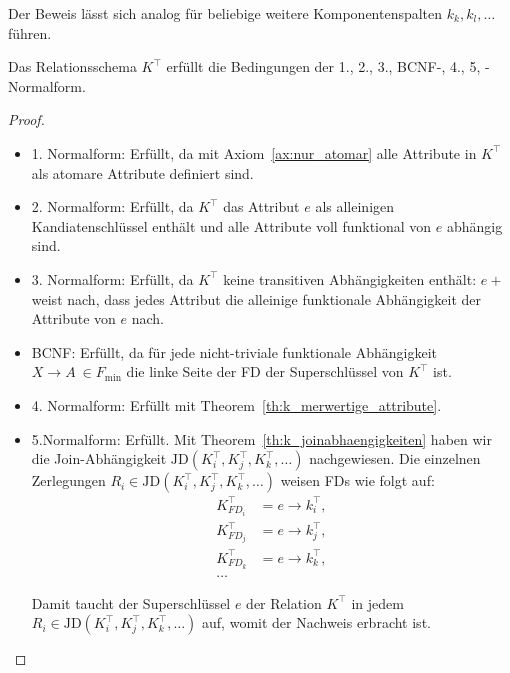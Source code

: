 \noindent
Der Beweis lässt sich analog für beliebige weitere Komponentenspalten $k_k, k_l, \ldots$ führen.

\bigskip
\begin{theorem}\label{f_min_norm}
    Das Relationsschema $K^\top$ erfüllt die Bedingungen der 1., 2., 3., BCNF-, 4., 5, -Normalform.
\end{theorem}

\begin{proof}
    \medskip
    {\ }
    \begin{itemize}
        \item 1. Normalform: Erfüllt, da mit Axiom~\ref{ax:nur_atomar} alle Attribute in $K^\top$ als atomare Attribute definiert sind.
        \item 2. Normalform: Erfüllt, da $K^\top$ das Attribut $e$ als alleinigen Kandiatenschlüssel enthält und alle Attribute voll funktional von $e$ abhängig sind.
        \item 3. Normalform: Erfüllt, da $K^\top$ keine transitiven Abhängigkeiten enthält: $e+$ weist nach, dass jedes Attribut  die alleinige funktionale Abhängigkeit der Attribute von $e$ nach.
        \item BCNF: Erfüllt, da für jede nicht-triviale funktionale Abhängigkeit $X \rightarrow A\ \in F_\text{min}$ die linke Seite der FD  der Superschlüssel von $K^\top$ ist.
        \item 4. Normalform: Erfüllt mit Theorem~\ref{th:k_merwertige_attribute}.
        \item 5.Normalform: Erfüllt. 
        Mit Theorem~\ref{th:k_joinabhaengigkeiten} haben wir die Join-Abhängigkeit $\text{JD}(K_i^\top, K_j^\top, K_k^\top, \ldots)$ nachgewiesen.
        Die einzelnen Zerlegungen $R_i \in \text{JD}(K^\top_i, K^\top_j, K^\top_k, \ldots)$ weisen FDs wie folgt auf:
        \[
            \begin{alignedat}{3}
            K^\top_{FD_i} &= e \rightarrow k^\top_i,\\
            K^\top_{FD_j} &= e \rightarrow k^\top_j,\\
            K^\top_{FD_k} &= e \rightarrow k^\top_k,\\
            \ldots
            \end{alignedat}
        \]

        \noindent
        Damit taucht der Superschlüssel $e$ der Relation $K^\top$ in jedem $R_i \in \text{JD}(K^\top_i, K^\top_j, K^\top_k, \ldots)$ auf, womit der Nachweis erbracht ist.
    \end{itemize}
\end{proof}

